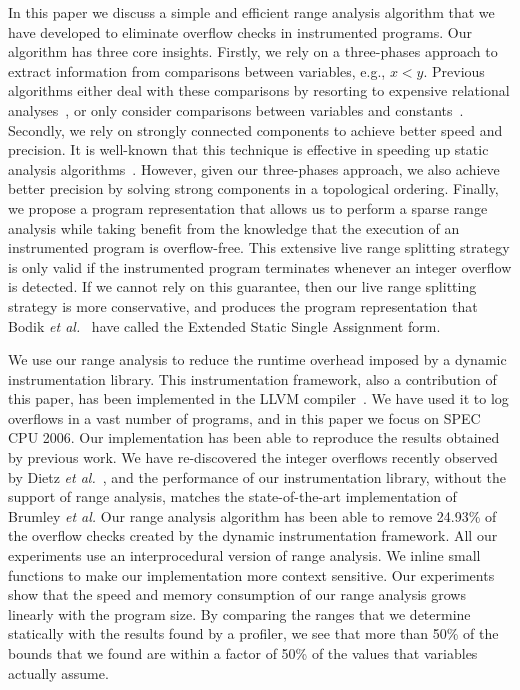 \documentclass[preprint]{sigplanconf}[10pt]
\begin{document}
In this paper we discuss a simple and efficient range analysis algorithm that
we have developed to eliminate overflow checks in instrumented programs.
Our algorithm has three core insights.
Firstly, we rely on a three-phases approach to extract information from
comparisons between variables, e.g., $x < y$.
Previous algorithms either deal with these comparisons by resorting to
expensive relational analyses~\cite{Cousot78,Lakhdar11,Mine06}, or only
consider comparisons between variables and
constants~\cite{Mahlke01,Patterson95,Stephenson00}.
Secondly, we rely on strongly connected components to achieve better speed and
precision.
It is well-known that this technique is effective in speeding up static analysis
algorithms~\cite[Sec 6.3]{Nielson99}.
However, given our three-phases approach, we also achieve better precision
by solving strong components in a topological ordering.
Finally, we propose a program representation that allows us to perform a sparse
range analysis while taking benefit from the knowledge that the execution of
an instrumented program is overflow-free.
This extensive live range splitting strategy is only valid if the instrumented
program terminates whenever an integer overflow is detected.
If we cannot rely on this guarantee, then our live range splitting strategy
is more conservative, and produces the program representation that Bodik
{\em et al.}~\cite{Bodik00} have called the Extended Static Single Assignment
form.

We use our range analysis to reduce the runtime overhead imposed by a dynamic
instrumentation library.
This instrumentation framework, also a contribution of this paper, has been
implemented in the LLVM compiler~\cite{Lattner04}.
We have used it to log overflows in a vast number of programs, and in this
paper we focus on SPEC CPU 2006.
Our implementation has been able to reproduce the results obtained by
previous work.
We have re-discovered the integer overflows recently observed by
Dietz {\em et al.}~\cite{Dietz12}, and the performance of our instrumentation
library, without the support of range analysis, matches the state-of-the-art
implementation of Brumley {\em et al.}
Our range analysis algorithm has been able to remove 24.93\% of the overflow
checks created by the dynamic instrumentation framework.
All our experiments use an interprocedural version of range analysis.
We inline small functions to make our implementation more context sensitive.
Our experiments show that the speed and memory consumption of our range
analysis grows linearly with the program size.
By comparing the ranges that we determine statically with the results found by
a profiler, we see that more than 50\% of the bounds that we found are within a
factor of 50\% of the values that variables actually assume.
\end{document}

